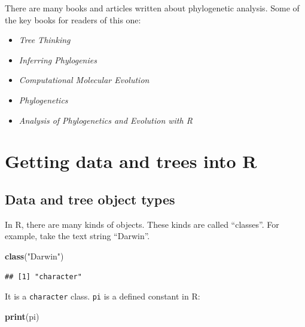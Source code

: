 \documentclass[]{article}
\newenvironment{Shaded}{\begin{snugshade}}{\end{snugshade}}
\newcommand{\KeywordTok}[1]{\textcolor[rgb]{0.13,0.29,0.53}{\textbf{#1}}}
\newcommand{\NormalTok}[1]{#1}
\newcommand{\StringTok}[1]{\textcolor[rgb]{0.31,0.60,0.02}{#1}}
\providecommand{\tightlist}{%
  \setlength{\itemsep}{0pt}\setlength{\parskip}{0pt}}
\theoremstyle{definition}
\theoremstyle{definition}
\theoremstyle{definition}
\theoremstyle{remark}
\begin{document}
There are many books and articles written about phylogenetic analysis.
Some of the key books for readers of this one:

\begin{itemize}
\tightlist
\item
  \emph{Tree Thinking} \citep{BaumTreethinkingintroduction2013}
\item
  \emph{Inferring Phylogenies}
  \citep{FelsensteinInferringphylogenies2004}
\item
  \emph{Computational Molecular Evolution}
  \citep{YangComputationalmolecularevolution2006}
\item
  \emph{Phylogenetics} \citep{SemplePhylogenetics2003}
\item
  \emph{Analysis of Phylogenetics and Evolution with R}
  \citep{ParadisAnalysisPhylogeneticsEvolution2011}
\end{itemize}

\hypertarget{getting-data-and-trees-into-r}{%
\section{Getting data and trees into
R}\label{getting-data-and-trees-into-r}}

\hypertarget{data-and-tree-object-types}{%
\subsection{Data and tree object
types}\label{data-and-tree-object-types}}

In R, there are many kinds of objects. These kinds are called
``classes''. For example, take the text string ``Darwin''.

\begin{Shaded}
\begin{Highlighting}[]
\KeywordTok{class}\NormalTok{(}\StringTok{"Darwin"}\NormalTok{)}
\end{Highlighting}
\end{Shaded}

\begin{verbatim}
## [1] "character"
\end{verbatim}

It is a \texttt{character} class. \texttt{pi} is a defined constant in
R:

\begin{Shaded}
\begin{Highlighting}[]
\KeywordTok{print}\NormalTok{(pi)}
\end{Highlighting}
\end{Shaded}
\end{document}
